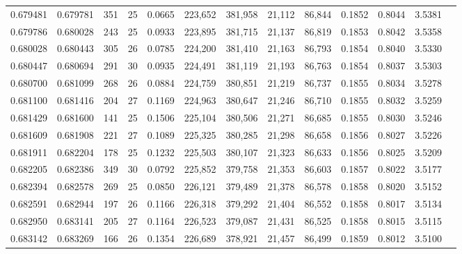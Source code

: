 \begin{tabular}{rrrrrrrrrrrrr}
0.679481 & 0.679781 &   351 &  25 &                                     0.0665 & 223,652 & 381,958 &  21,112 &  86,844 & 0.1852 & 0.8044 & 3.5381 \\
0.679786 & 0.680028 &   243 &  25 &                                     0.0933 & 223,895 & 381,715 &  21,137 &  86,819 & 0.1853 & 0.8042 & 3.5358 \\
0.680028 & 0.680443 &   305 &  26 &                                     0.0785 & 224,200 & 381,410 &  21,163 &  86,793 & 0.1854 & 0.8040 & 3.5330 \\
0.680447 & 0.680694 &   291 &  30 &                                     0.0935 & 224,491 & 381,119 &  21,193 &  86,763 & 0.1854 & 0.8037 & 3.5303 \\
0.680700 & 0.681099 &   268 &  26 &                                     0.0884 & 224,759 & 380,851 &  21,219 &  86,737 & 0.1855 & 0.8034 & 3.5278 \\
0.681100 & 0.681416 &   204 &  27 &                                     0.1169 & 224,963 & 380,647 &  21,246 &  86,710 & 0.1855 & 0.8032 & 3.5259 \\
0.681429 & 0.681600 &   141 &  25 &                                     0.1506 & 225,104 & 380,506 &  21,271 &  86,685 & 0.1855 & 0.8030 & 3.5246 \\
0.681609 & 0.681908 &   221 &  27 &                                     0.1089 & 225,325 & 380,285 &  21,298 &  86,658 & 0.1856 & 0.8027 & 3.5226 \\
0.681911 & 0.682204 &   178 &  25 &                                     0.1232 & 225,503 & 380,107 &  21,323 &  86,633 & 0.1856 & 0.8025 & 3.5209 \\
0.682205 & 0.682386 &   349 &  30 &                                     0.0792 & 225,852 & 379,758 &  21,353 &  86,603 & 0.1857 & 0.8022 & 3.5177 \\
0.682394 & 0.682578 &   269 &  25 &                                     0.0850 & 226,121 & 379,489 &  21,378 &  86,578 & 0.1858 & 0.8020 & 3.5152 \\
0.682591 & 0.682944 &   197 &  26 &                                     0.1166 & 226,318 & 379,292 &  21,404 &  86,552 & 0.1858 & 0.8017 & 3.5134 \\
0.682950 & 0.683141 &   205 &  27 &                                     0.1164 & 226,523 & 379,087 &  21,431 &  86,525 & 0.1858 & 0.8015 & 3.5115 \\
0.683142 & 0.683269 &   166 &  26 &                                     0.1354 & 226,689 & 378,921 &  21,457 &  86,499 & 0.1859 & 0.8012 & 3.5100 \\

\end{tabular}
